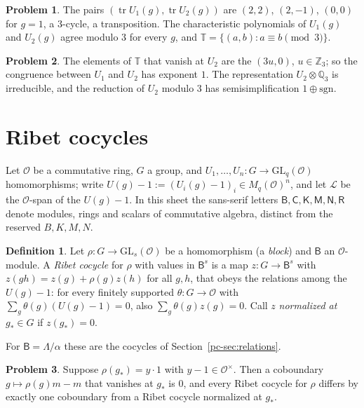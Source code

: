 \documentclass[reqno]{amsart}
\theoremstyle{definition}
\newtheorem{problem}{Problem}[section]
\newtheorem{definition}{Definition}[section]
\theoremstyle{plain}
\newcommand{\Z}{\mathbb{Z}}
\newcommand{\Q}{\mathbb{Q}}
\newcommand{\Oc}{\mathcal{O}}
\newcommand{\tr}{\operatorname{tr}}
\newcommand{\GL}{\mathrm{GL}}
\newcommand{\Lc}{\mathcal{L}}
\newcommand{\Tb}{\mathbb{T}}
\begin{document}
\begin{problem}\label{pr:model-traces}
The pairs \((\tr U_1(g), \tr U_2(g))\) are \((2,2)\), \((2,-1)\), \((0,0)\) for \(g = 1\), a \(3\)-cycle, a transposition.  The characteristic polynomials of \(U_1(g)\) and \(U_2(g)\) agree modulo \(3\) for every \(g\), and \(\Tb = \{(a,b) : a \equiv b \pmod 3\}\).
\end{problem}

\begin{problem}\label{pr:model-congruence}
The elements of \(\Tb\) that vanish at \(U_2\) are the \((3u, 0)\), \(u \in \Z_3\); so the congruence between \(U_1\) and \(U_2\) has exponent \(1\).  The representation \(U_2 \otimes \Q_3\) is irreducible, and the reduction of \(U_2\) modulo \(3\) has semisimplification \(1 \oplus \mathrm{sgn}\).
\end{problem}

\section{Ribet cocycles}\label{sec:ribet}

Let \(\Oc\) be a commutative ring, \(G\) a group, and \(U_1, \dots, U_n \colon G \to \GL_q(\Oc)\) homomorphisms; write \(U(g) - 1 := (U_i(g) - 1)_i \in M_q(\Oc)^n\), and let \(\Lc\) be the \(\Oc\)-span of the \(U(g) - 1\).  In this sheet the sans-serif letters \(\mathsf B, \mathsf C, \mathsf K, \mathsf M, \mathsf N, \mathsf R\) denote modules, rings and scalars of commutative algebra, distinct from the reserved \(B, K, M, N\).

\begin{definition}\label{def:ribet}
Let \(\rho \colon G \to \GL_s(\Oc)\) be a homomorphism (a \emph{block}) and \(\mathsf B\) an \(\Oc\)-module.  A \emph{Ribet cocycle} for \(\rho\) with values in \(\mathsf B^s\) is a map \(z \colon G \to \mathsf B^s\) with \(z(gh) = z(g) + \rho(g)z(h)\) for all \(g, h\), that obeys the relations among the \(U(g) - 1\): for every finitely supported \(\theta \colon G \to \Oc\) with \(\sum_g \theta(g)(U(g) - 1) = 0\), also \(\sum_g \theta(g) z(g) = 0\).  Call \(z\) \emph{normalized at} \(g_* \in G\) if \(z(g_*) = 0\).
\end{definition}

For \(\mathsf B = \Lambda/\alpha\) these are the cocycles of Section~\ref{pc-sec:relations}.

\begin{problem}\label{pr:normalize}
Suppose \(\rho(g_*) = y \cdot 1\) with \(y - 1 \in \Oc^\times\).  Then a coboundary \(g \mapsto \rho(g)m - m\) that vanishes at \(g_*\) is \(0\), and every Ribet cocycle for \(\rho\) differs by exactly one coboundary from a Ribet cocycle normalized at \(g_*\).
\end{problem}
\end{document}
